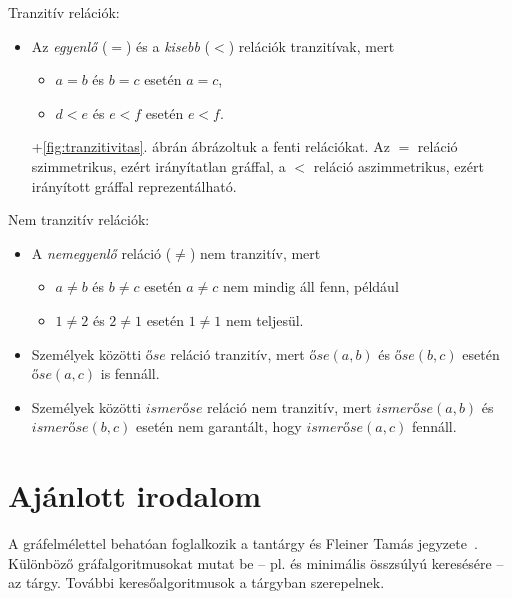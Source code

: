 \begin{pelda}

	Tranzitív relációk:
	\begin{itemize}
	\item Az \emph{egyenlő} ($=$) és a \emph{kisebb} ($<$) relációk tranzitívak, mert
	\begin{itemize}
		\item $a = b$ és $b = c$ esetén $a = c$,
		\item $d < e$ és $e < f$ esetén $e < f$.
	\end{itemize}
	\Az+\ref{fig:tranzitivitas}. ábrán ábrázoltuk a fenti relációkat. Az $=$ reláció szimmetrikus, ezért irányítatlan gráffal, a $<$ reláció aszimmetrikus, ezért irányított gráffal reprezentálható.
	\end{itemize}
	
	Nem tranzitív relációk:
	\begin{itemize}
	\item A \emph{nemegyenlő} reláció ($\neq$) nem tranzitív, mert 
	\begin{itemize}
		\item $a \neq b$ és $b \neq c$ esetén $a \neq c$ nem mindig áll fenn, például
		\item $1 \neq 2$ és $2 \neq 1$ esetén $1 \neq 1$ nem teljesül.
	\end{itemize}
	\item Személyek közötti $\mathit{őse}$ reláció tranzitív, mert $\mathit{őse}(a, b)$ és $\mathit{őse}(b, c)$ esetén $\mathit{őse}(a, c)$ is fennáll. 
	\item Személyek közötti $\mathit{ismerőse}$ reláció nem tranzitív, mert $\mathit{ismerőse}(a, b)$ és $\mathit{ismerőse}(b, c)$ esetén nem garantált, hogy $\mathit{ismerőse}(a, c)$ fennáll.
	\end{itemize}
\end{pelda} 


\section{Ajánlott irodalom}

A gráfelmélettel behatóan foglalkozik a \bszketto tantárgy és Fleiner Tamás jegyzete~\cite{FleinerJegyzet}. Különböző gráfalgoritmusokat mutat be -- pl.  és minimális összsúlyú  keresésére -- az \algel tárgy. További keresőalgoritmusok a \mestersegesintelligencia tárgyban szerepelnek.

